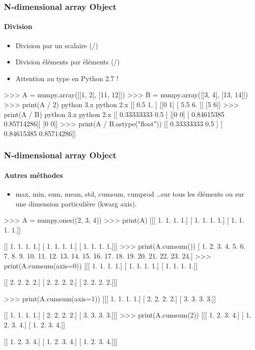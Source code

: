 \begin{frame}[fragile]
\frametitle{N-dimensional array Object}
\framesubtitle{Division}
\begin{itemize}
 \item Division par un scalaire (/)
 \item Division éléments par éléments (/) 
 \item Attention au type en Python 2.7 ! 
\end{itemize}
\begin{pythonConsole}
>>> A = numpy.array([[1, 2], [11, 12]])
>>> B = numpy.array([[3, 4], [13, 14]])
>>> print(A / 2)
python 3.x                      python 2.x
[[ 0.5  1. ]				    [[0 1]
 [ 5.5  6. ]] 				     [5 6]]
>>> print(A / B)
python 3.x                      python 2.x  
[[ 0.33333333  0.5       ]      [[0 0]
 [ 0.84615385  0.85714286]]      [0 0]]
>>> print(A / B.astype("float"))
[[ 0.33333333  0.5       ]
 [ 0.84615385  0.85714286]]
\end{pythonConsole}
\end{frame}
\begin{frame}[fragile]
\frametitle{N-dimensional array Object}
\framesubtitle{Autres méthodes}
\begin{itemize}
 \item max, min, sum, mean, std, cumsum, cumprod \dots sur tous les éléments ou sur une dimension particulière (kwarg axis). 
\end{itemize}
\begin{minipage}{5cm}
\begin{pythonConsole}
>>> A = numpy.ones((2, 3, 4))
>>> print(A)
[[[ 1.  1.  1.  1.]
  [ 1.  1.  1.  1.]
  [ 1.  1.  1.  1.]]

 [[ 1.  1.  1.  1.]
  [ 1.  1.  1.  1.]
  [ 1.  1.  1.  1.]]]          
>>> print(A.cumsum())
[  1.   2.   3.   4.   5.   6.   7.   8.   9.  10.  11.  12.  13.  14.  15. 16.  17.  18.  19.  20.  21.  22.  23.  24.]
>>> print(A.cumsum(axis=0))
[[[ 1.  1.  1.  1.]
  [ 1.  1.  1.  1.]
  [ 1.  1.  1.  1.]]

 [[ 2.  2.  2.  2.]
  [ 2.  2.  2.  2.]
  [ 2.  2.  2.  2.]]]
\end{pythonConsole}
\end{minipage}
\begin{minipage}{5cm}
\begin{pythonConsole}
>>> print(A.cumsum(axis=1))
[[[ 1.  1.  1.  1.]
  [ 2.  2.  2.  2.]
  [ 3.  3.  3.  3.]]

 [[ 1.  1.  1.  1.]
  [ 2.  2.  2.  2.]
  [ 3.  3.  3.  3.]]]
>>> print(A.cumsum(2))
[[[ 1.  2.  3.  4.]
  [ 1.  2.  3.  4.]
  [ 1.  2.  3.  4.]]

 [[ 1.  2.  3.  4.]
  [ 1.  2.  3.  4.]
  [ 1.  2.  3.  4.]]]
\end{pythonConsole}
\end{minipage}
\end{frame}
